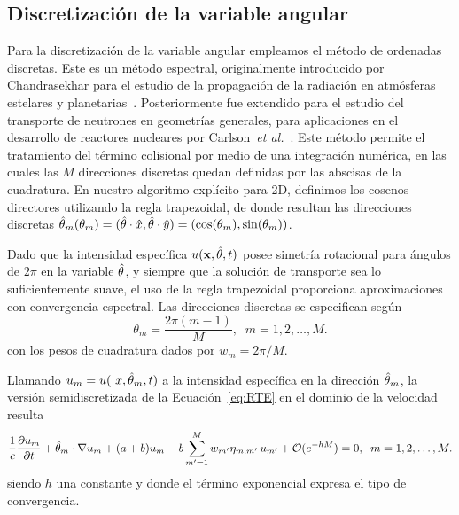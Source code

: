 \subsection{Discretización de la variable angular}
\label{sec:dord}
Para la discretización de la variable angular empleamos el
método de ordenadas discretas. Este es un método espectral, 
originalmente introducido por Chandrasekhar 
para el estudio de la propagación de la radiación en atmósferas 
estelares y planetarias~\cite{Chandrasekhar1960}. 
Posteriormente fue extendido para el estudio 
del transporte de neutrones en geometrías generales, 
para aplicaciones en el desarrollo de reactores nucleares  
por Carlson~\textit{et al.}~\cite{Lathrop1992}. 
Este método permite el tratamiento del término colisional por medio de una 
integración numérica, en las cuales las $M$ direcciones discretas 
quedan definidas por las abscisas de la cuadratura.
En nuestro algoritmo explícito para 2D, definimos los cosenos directores 
utilizando la regla trapezoidal, 
de donde resultan las direcciones discretas 
$\hat{\theta}_m(\theta_m)=(\hat{\theta}\cdot \hat x,\hat{\theta}\cdot \hat y)=(\cos(\theta_m),\sin(\theta_m))$.

Dado que la intensidad específica $u(\mathbf{x},\hat{\theta},t)$ posee simetría rotacional
para ángulos de $2\pi$ en la variable $\hat{\theta}$, y siempre que la solución de 
transporte sea lo suficientemente
suave, el uso de la regla trapezoidal 
proporciona aproximaciones con convergencia espectral. 
Las direcciones discretas se especifican 
según
\begin{equation}
\theta_m=\frac{2\pi(m-1)}{M}, \; \; m=1,2,\ldots,M.
\label{eq:RTETrapz}
\end{equation}
con los pesos de cuadratura dados por $w_{m}=2\pi/M$.

Llamando  $ u_m= u (\ x, \hat{\theta}_m, t)$ a la intensidad específica 
en la dirección $\hat{\theta}_m$, la versión semidiscretizada de la 
Ecuación~\eqref{eq:RTE} en el dominio de la velocidad resulta
\begin{equation*}
\frac{1}{c}  \frac{\partial  u_m}{\partial t}  
 + \hat{\theta}_m
\cdot  \nabla u_m + (a+b) u_m
-b\sum_{m'=1}^M w_{m'}
\eta_{m,m'} \, u_{m'}+\mathcal{O}(e^{-hM}) =0, \; \; m=1,2,\ldots,M.
\label{eq:RTEdom}
\end{equation*}
siendo $h$ una constante y donde el término exponencial expresa el tipo de convergencia.

